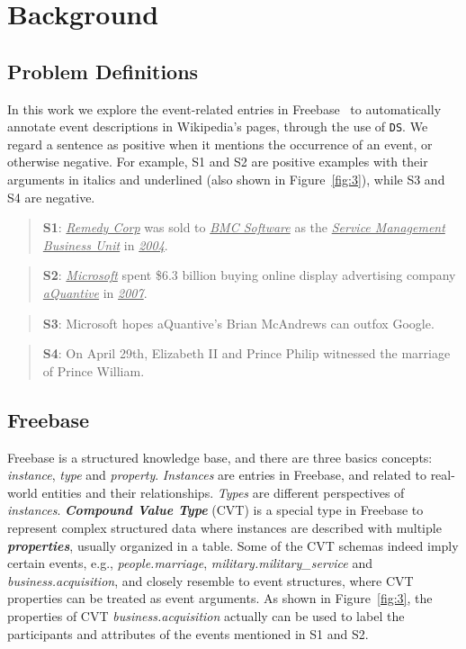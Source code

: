 \section{Background}
\subsection{Problem Definitions}
In this work we explore the event-related entries in Freebase~\cite{bollacker2008freebase} to automatically annotate event descriptions in Wikipedia's pages, through the use of \texttt{DS}. We regard a sentence as positive when it mentions the occurrence of an event, or otherwise negative. For example, S1 and S2 are positive examples with their arguments in italics and underlined (also shown in Figure~\ref{fig:3}), while S3 and S4 are negative.
\begin{quote}
\textbf{S1}: \underline{\emph{Remedy Corp}} was sold to \underline{\emph{BMC Software}} as the \underline{\emph{Service Management Business Unit}} in \underline{\emph{2004}}.
\end{quote}
\begin{quote}
\textbf{S2}: \underline{\emph{Microsoft}} spent \$6.3 billion buying online display advertising company \underline{\emph{aQuantive}} in \underline{\emph{2007}}.
\end{quote}
\begin{quote}
\textbf{S3}: Microsoft hopes aQuantive's Brian McAndrews can outfox Google.
\end{quote}
\begin{quote}
\textbf{S4}: On April 29th, Elizabeth II and Prince Philip witnessed the marriage of Prince William.
\end{quote}
%
\subsection{Freebase}
Freebase is a structured knowledge base, and there are three basics concepts: \emph{instance}, \emph{type} and \emph{property}. \emph{Instances} are entries in Freebase, and related to real-world entities and their relationships. \emph{Types} are different perspectives of \emph{instances}. \textbf{\emph{Compound Value Type}} (CVT) is a special type in Freebase to represent complex structured data where instances are described with multiple \textbf{\emph{properties}}, usually organized in a table. Some of the CVT schemas indeed imply certain events, e.g., \emph{people.marriage}, \emph{military.military\_service} and \emph{business.acquisition}, and closely resemble to event structures, where CVT properties can be treated as event arguments. As shown in Figure~\ref{fig:3}, the properties of CVT  \emph{business.acquisition}  actually can be used to label  %
the participants and attributes of the events mentioned in S1 and S2.

